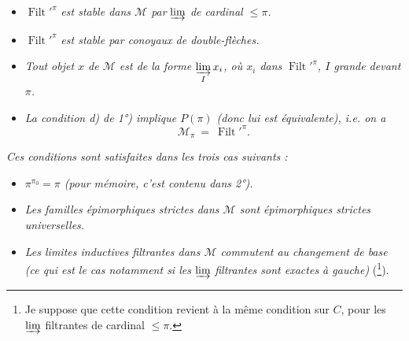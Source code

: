 \documentclass[11pt]{article}
\newcommand{\printedpage}[1]{\if\relax\detokenize{#1}\relax\else\marginpar{\footnotesize p.~#1}\fi}
\newcommand{\msp}[1]{\marginpar{\footnotesize [#1]}}
\newcommand{\Filt}{\operatorname{Filt}}
\begin{document}
\setcounter{footnote}{49}

\printedpage{39}

\begin{itemize}
\item[\textit{1)}] $\Filt'^{\pi}$ \textit{est stable dans $\mathcal{M}$ par} $\varinjlim$ \textit{de cardinal $\leqslant \pi$.}
\item[\textit{1$'$)}] $\Filt'^{\pi}$ \textit{est stable par conoyaux de double-flèches.}
\item[\textit{2)}] \textit{Tout objet $x$ de $\mathcal{M}$ est de la forme $\varinjlim\limits_{I} x_i$, où $x_i$ dans} $\Filt'^{\pi}$\textit{, $I$ grande devant $\pi$.}
\item[\textit{3)}] \textit{La condition d) de 1°) implique $P(\pi)$ (donc lui est équivalente), i.e. on a}
\[ \mathcal{M}_{\pi} \ = \ \Filt'^{\pi}. \]
\end{itemize}

\msp{page 127}
\textit{Ces conditions sont satisfaites dans les trois cas suivants :}
\begin{itemize}
\item[\textit{A)}] \textit{$\pi^{\pi_0} = \pi$ (pour mémoire, c'est contenu dans 2°).}
\item[\textit{B)}] \textit{Les familles épimorphiques strictes dans $\mathcal{M}$ sont épimorphiques strictes universelles.}
\item[\textit{C)}] \textit{Les limites inductives filtrantes dans $\mathcal{M}$ commutent au changement de base (ce qui est le cas notamment si les} $\varinjlim$ \textit{filtrantes sont exactes à gauche)} (\footnote{Je suppose que cette condition revient à la même condition sur $C$, pour les $\varinjlim$ filtrantes de cardinal $\leqslant \pi$.}).
\end{itemize}
\end{document}

